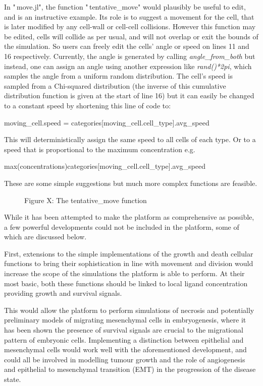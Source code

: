 \documentclass[12pt]{article}
\begin{document}
In "\,move.jl", the function "\,tentative\_move" would plausibly be 
useful to edit, and is an instructive example. Its role is to suggest a 
movement for the cell, that is later modified by any cell-wall or 
cell-cell collisions. However this function may be edited, cells will 
collide as per usual, and will not overlap or exit the bounds of the 
simulation. So users can freely edit the cells' angle or speed on lines 
11 and 16 respectively. Currently, the angle is generated by calling 
{\itshape angle\_from\_both} but instead, one can assign an angle using 
another expression like {\itshape rand()*2pi}, which samples the angle 
from a uniform random distribution. The cell's speed is sampled from a 
Chi-squared distribution (the inverse of this cumulative distribution 
function is given at the start of line 16) but it can easily be changed 
to a constant speed by shortening this line of code to:

{\fontsize{10pt}{10pt} \ttfamily
moving\_cell.speed = categories{[}moving\_cell.cell\_type{]}.avg\_speed} 

This will deterministically assign the same speed to all cells of 
each type. Or to a speed that is proportional to the maximum 
concentration e.g. 

{\fontsize{10pt}{10pt}\ttfamily 
max(concentrations)categories{[}moving\_cell.cell\_type{]}.avg\_speed} 

These are some simple suggestions but much more complex functions are 
feasible.

\begin{figure}[H]
\centering
\caption{Figure X: The tentative\_move function}
\end{figure}

While it has been attempted to make the platform as comprehensive as 
possible, a few powerful developments could not be included in the 
platform, some of which are discussed below. 

First, extensions to the simple implementations of the growth and death 
cellular functions to bring their sophistication in line with movement 
and division would increase the scope of the simulations the platform is 
able to perform. At their most basic, both these functions should be 
linked to local ligand concentration providing growth and survival 
signals. 

This would allow the platform to perform simulations of necrosis and 
potentially preliminary models of migrating mesenchymal cells in 
embryogenesis, where it has been shown the presence of survival signals 
are crucial to the migrational pattern of embryonic cells. Implementing 
a distinction between epithelial and mesenchymal cells would work well 
with the aforementioned development, and could all be involved in 
modelling tumour growth and the role of angiogenesis and epithelial to 
mesenchymal transition (EMT) in the progression of the disease state.
\end{document}
